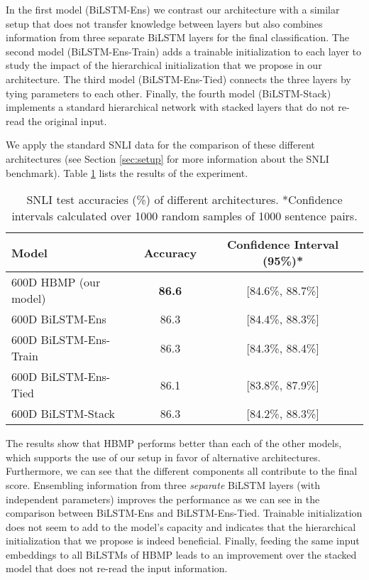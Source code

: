 \documentclass{nle}
\begin{document}
In the first model (BiLSTM-Ens) we contrast our architecture with a similar setup that does not transfer knowledge between layers but also combines information from three separate BiLSTM layers for the final classification. The second model (BiLSTM-Ens-Train) adds a trainable initialization to each layer to study the impact of the hierarchical initialization that we propose in our architecture. The third model (BiLSTM-Ens-Tied) connects the three layers by tying parameters to each other. Finally, the fourth model (BiLSTM-Stack) implements a standard hierarchical network with stacked layers that do not re-read the original input.

We apply the standard SNLI data for the comparison of these different architectures (see Section \ref{sec:setup} for more information about the SNLI benchmark). Table \ref{table:variants} lists the results of the experiment.

\begin{table}[h]
\begin{small}
\begin{center}
\begin{tabular}{l c c}
\hline \bf Model & \bf Accuracy & \bf Confidence Interval (95\%)*\\ \hline
600D HBMP (our model) & \bf 86.6 & [84.6\%, 88.7\%]\\
600D BiLSTM-Ens & 86.3 & [84.4\%, 88.3\%]\\
600D BiLSTM-Ens-Train & 86.3 & [84.3\%, 88.4\%]\\
600D BiLSTM-Ens-Tied & 86.1 & [83.8\%, 87.9\%]\\
600D BiLSTM-Stack & 86.3 & [84.2\%, 88.3\%]\\
\hline
\end{tabular}
\end{center}
\end{small}
\caption{\label{table:variants} SNLI test accuracies (\%) of different architectures. *Confidence intervals calculated over 1000 random samples of 1000 sentence pairs.}
\end{table}

The results show that HBMP performs better than each of the other models, which supports the use of our setup in favor of alternative architectures. Furthermore, we can see that the different components all contribute to the final score. Ensembling information from three {\em separate} BiLSTM layers (with independent parameters) improves the performance as we can see in the comparison between BiLSTM-Ens and BiLSTM-Ens-Tied. Trainable initialization does not seem to add to the model's capacity and indicates that the hierarchical initialization that we propose is indeed beneficial. Finally, feeding the same input embeddings to all BiLSTMs of HBMP leads to an improvement over the stacked model that does not re-read the input information.
\end{document}
